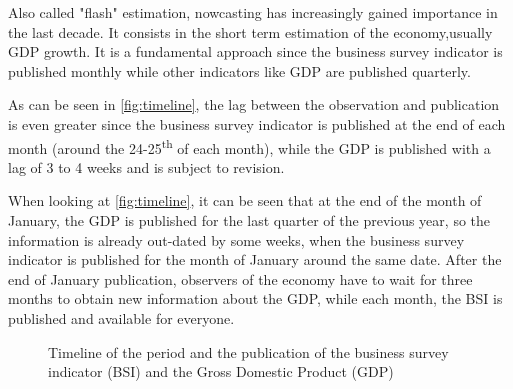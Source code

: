 \documentclass[12pt,a4paper,oneside]{book}
\newcommand{\ImageWidth}{11cm}
\begin{document}
Also called "flash" estimation, nowcasting has increasingly gained importance in the last decade.
It consists in the short term estimation of the economy,usually GDP growth.
It is a fundamental approach since the business survey indicator is published monthly while other indicators like GDP are published quarterly.

As can be seen in \autoref{fig:timeline}, 
the lag between the observation and publication is even greater since the business survey indicator is published at the end of each month (around the 24-25\textsuperscript{th} of each month), while the GDP is published with a lag of 3 to 4 weeks and is subject to revision.

When looking at \autoref{fig:timeline}, it can be seen that at the end of the month of January, the GDP is published for the last quarter of the previous year, so the information is already out-dated by some weeks, when the business survey indicator is published for the month of January around the same date. After the end of January publication, observers of the economy have to wait for three months to obtain new information about the GDP, while each month, the BSI is published and available for everyone.

\begin{figure}[htp!]
     \centering \footnotesize
    \small
    \caption{Timeline of the period and the publication of the business survey indicator (BSI) and the Gross Domestic Product (GDP)}
    \label{fig:timeline}
\end{figure}
\end{document}
